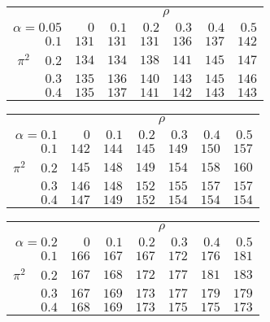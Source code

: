\begin{tabular}{r|rrrrrr}
\hline\hline
 &\multicolumn{6}{c}{$\rho$} \\ 
 $\alpha = 0.05$ & $0$ & $0.1$ & $0.2$ & $0.3$ & $0.4$ & $0.5$ \\ 
 \hline$0.1$ & $131$ & $131$ & $131$ & $136$ & $137$ & $142$\\ 
$\pi^2\;\;\;$ $0.2$ & $134$ & $134$ & $138$ & $141$ & $145$ & $147$\\ 
$0.3$ & $135$ & $136$ & $140$ & $143$ & $145$ & $146$\\ 
$0.4$ & $135$ & $137$ & $141$ & $142$ & $143$ & $143$\\ 
 \hline 
 \end{tabular}
 
 \vspace{2em} 
 
\begin{tabular}{r|rrrrrr}
\hline\hline
 &\multicolumn{6}{c}{$\rho$} \\ 
 $\alpha = 0.1$ & $0$ & $0.1$ & $0.2$ & $0.3$ & $0.4$ & $0.5$ \\ 
 \hline$0.1$ & $142$ & $144$ & $145$ & $149$ & $150$ & $157$\\ 
$\pi^2\;\;\;$ $0.2$ & $145$ & $148$ & $149$ & $154$ & $158$ & $160$\\ 
$0.3$ & $146$ & $148$ & $152$ & $155$ & $157$ & $157$\\ 
$0.4$ & $147$ & $149$ & $152$ & $154$ & $154$ & $154$\\ 
 \hline 
 \end{tabular}
 
 \vspace{2em} 
 
\begin{tabular}{r|rrrrrr}
\hline\hline
 &\multicolumn{6}{c}{$\rho$} \\ 
 $\alpha = 0.2$ & $0$ & $0.1$ & $0.2$ & $0.3$ & $0.4$ & $0.5$ \\ 
 \hline$0.1$ & $166$ & $167$ & $167$ & $172$ & $176$ & $181$\\ 
$\pi^2\;\;\;$ $0.2$ & $167$ & $168$ & $172$ & $177$ & $181$ & $183$\\ 
$0.3$ & $167$ & $169$ & $173$ & $177$ & $179$ & $179$\\ 
$0.4$ & $168$ & $169$ & $173$ & $175$ & $175$ & $173$\\ 
 \hline 
 \end{tabular}